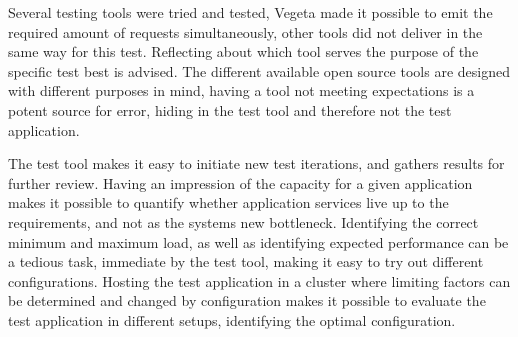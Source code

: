 Several testing tools were tried and tested, Vegeta made it possible to emit the required amount of requests simultaneously, other tools did not deliver in the same way for this test. Reflecting about which tool serves the purpose of the specific test best is advised. The different available open source tools are designed with different purposes in mind, having a tool not meeting expectations is a potent source for error, hiding in the test tool and therefore not the test application.

The test tool makes it easy to initiate new test iterations, and gathers results for further review. Having an impression of the capacity for a given application makes it possible to quantify whether application services live up to the requirements, and not as the systems new bottleneck. Identifying the correct minimum and maximum load, as well as identifying expected performance can be a tedious task, immediate by the test tool, making it easy to try out different configurations. Hosting the test application in a cluster where limiting factors can be determined and changed by configuration makes it possible to evaluate the test application in different setups, identifying the optimal configuration.



